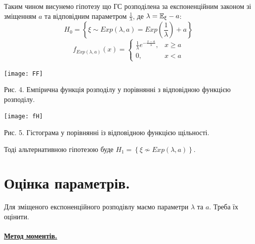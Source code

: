 \documentclass[14pt,a4paper]{scrartcl}
\begin{document}
Таким чином висунемо гіпотезу що ГС розподілена за експоненційним законом зі зміщенням $a$ та відповідним параметром $\frac1\lambda$, де $\lambda=\mathbb{E} _\xi-a$:
$$H_0=\left\{\xi\sim Exp(\lambda,a)=Exp(\frac1\lambda)+a\right\}$$
$$f_{Exp(\lambda,a)}(x)=\left\{\begin{array}{ll}
  \frac1\lambda e^{-\frac{x-a}\lambda},&x\geq a\\
  0,&x<a
\end{array}\right.$$
\begin{center}
  \texttt{[image: FF]}
  \caption{Рис. 4. Емпірична функція розподілу у порівнянні з відповідною функцією розподілу.}
\end{center}
\begin{center}
  \texttt{[image: fH]}
  \caption{Рис. 5. Гістограма у порівнянні із відповідною функцією щільності.}
\end{center}
Тоді альтернативною гіпотезою буде $H_1=\left\{\xi\nsim Exp(\lambda,a)\right\}$.

\newpage
\section{Оцінка параметрів.}

Для зміщеного експоненційного розподівлу маємо параметри $\lambda$ та $a$. Треба їх оцінити.\\\\
\quad\underline{\textbf{Метод моментів.}}\\
\end{document}
